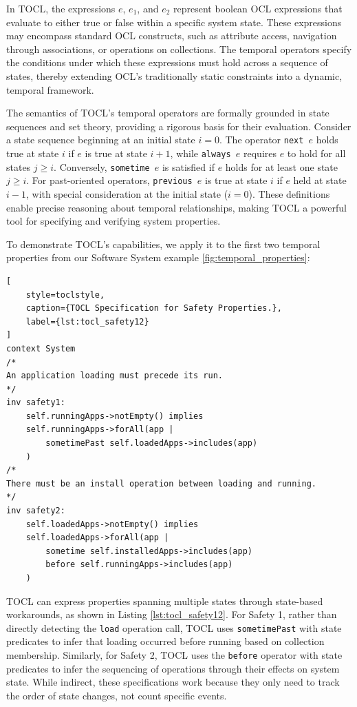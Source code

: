 In TOCL, the expressions $e$, $e_1$, and $e_2$ represent boolean OCL expressions that evaluate to either true or false within a specific system state. These expressions may encompass standard OCL constructs, such as attribute access, navigation through associations, or operations on collections. The temporal operators specify the conditions under which these expressions must hold across a sequence of states, thereby extending OCL's traditionally static constraints into a dynamic, temporal framework.

The semantics of TOCL's temporal operators are formally grounded in state sequences and set theory, providing a rigorous basis for their evaluation. Consider a state sequence beginning at an initial state $i = 0$. The operator \texttt{next $e$} holds true at state $i$ if $e$ is true at state $i+1$, while \texttt{always $e$} requires $e$ to hold for all states $j \geq i$. Conversely, \texttt{sometime $e$} is satisfied if $e$ holds for at least one state $j \geq i$. For past-oriented operators, \texttt{previous $e$} is true at state $i$ if $e$ held at state $i-1$, with special consideration at the initial state ($i = 0$). These definitions enable precise reasoning about temporal relationships, making TOCL a powerful tool for specifying and verifying system properties.

To demonstrate TOCL's capabilities, we apply it to the first two temporal properties from our Software System example \ref{fig:temporal_properties}:

\begin{lstlisting}[
    style=toclstyle, 
    caption={TOCL Specification for Safety Properties.}, 
    label={lst:tocl_safety12}
]
context System 
/*
An application loading must precede its run.
*/
inv safety1: 
    self.runningApps->notEmpty() implies 
    self.runningApps->forAll(app | 
        sometimePast self.loadedApps->includes(app)
    )
/*
There must be an install operation between loading and running.
*/
inv safety2: 
    self.loadedApps->notEmpty() implies 
    self.loadedApps->forAll(app | 
        sometime self.installedApps->includes(app) 
        before self.runningApps->includes(app)
    )
\end{lstlisting}

TOCL can express properties spanning multiple states through state-based workarounds, as shown in Listing \ref{lst:tocl_safety12}. For Safety 1, rather than directly detecting the \texttt{load} operation call, TOCL uses \texttt{sometimePast} with state predicates to infer that loading occurred before running based on collection membership. Similarly, for Safety 2, TOCL uses the \texttt{before} operator with state predicates to infer the sequencing of operations through their effects on system state. While indirect, these specifications work because they only need to track the order of state changes, not count specific events.

